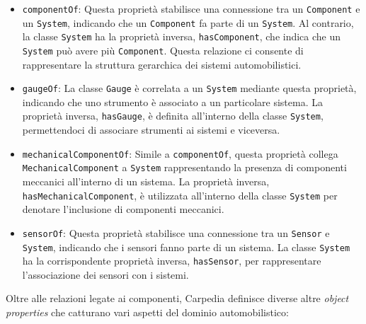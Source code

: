 \begin{itemize}
    \item \texttt{componentOf}: Questa proprietà stabilisce una connessione tra un \texttt{Component} e un \texttt{System}, indicando che un \texttt{Component} fa parte di un \texttt{System}. Al contrario, la classe \texttt{System} ha la proprietà inversa, \texttt{hasComponent}, che indica che un \texttt{System} può avere più \texttt{Component}. Questa relazione ci consente di rappresentare la struttura gerarchica dei sistemi automobilistici.
    \item \texttt{gaugeOf}: La classe \texttt{Gauge} è correlata a un \texttt{System} mediante questa proprietà, indicando che uno strumento è associato a un particolare sistema. La proprietà inversa, \texttt{hasGauge}, è definita all'interno della classe \texttt{System}, permettendoci di associare strumenti ai sistemi e viceversa.
    \item \texttt{mechanicalComponentOf}: Simile a \texttt{componentOf}, questa proprietà collega \texttt{MechanicalComponent} a \texttt{System} rappresentando la presenza di componenti meccanici all'interno di un sistema. La proprietà inversa, \texttt{hasMechanicalComponent}, è utilizzata all'interno della classe \texttt{System} per denotare l'inclusione di componenti meccanici.
    \item \texttt{sensorOf}: Questa proprietà stabilisce una connessione tra un \texttt{Sensor} e \texttt{System}, indicando che i sensori fanno parte di un sistema. La classe \texttt{System} ha la corrispondente proprietà inversa, \texttt{hasSensor}, per rappresentare l'associazione dei sensori con i sistemi.
\end{itemize}

Oltre alle relazioni legate ai componenti, Carpedia definisce diverse altre \textit{object properties} che catturano vari aspetti del dominio automobilistico:

